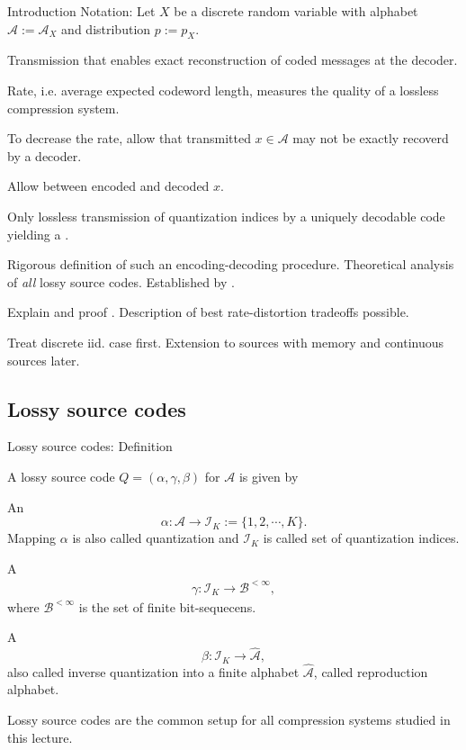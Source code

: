 \begin{frame}{Introduction}
Notation: Let $X$ be a discrete random variable with alphabet $\mathcal{A}:=\mathcal{A}_X$ and distribution $p:=p_X$.

\bit
\item Transmission that enables exact reconstruction of coded messages at the decoder.  
\item Rate, i.e. average expected codeword length, measures the quality of a lossless compression system. 
\eit
{} 
\bit 
\item  To decrease the rate, allow that transmitted $x\in\mathcal{A}$ may not 
be exactly recoverd by a decoder. 
\item Allow  between encoded and decoded $x$. 
\item Only lossless transmission of quantization indices by a uniquely decodable code yielding a . 
\item[\iarrow]  Rigorous definition of such an encoding-decoding procedure. 
\eit
{} Theoretical analysis of \textit{all} lossy source codes. Established by .  
\bit
\item {} Explain and proof . Description 
of best rate-distortion tradeoffs possible.    
\item Treat discrete iid. case first. Extension to sources with memory and continuous sources later. 
\eit
\end{frame}

\subsection{Lossy source codes}
\begin{frame}{Lossy source codes: Definition}
\begin{definition}
A lossy source code $Q=(\alpha,\gamma,\beta)$ for $\mathcal{A}$ is given by
\bit
\item An  
\[
\alpha: \mathcal{A}\to \mathcal{I}_K:=\{1,2,\cdots,K\}. 
\]
Mapping $\alpha$ is also called quantization and $\mathcal{I}_K$ is called set of quantization indices. 
\item A  
\begin{align*}
\gamma: \mathcal{I}_K\to \mathcal{B}^{<\infty}, 
\end{align*}
where $\mathcal{B}^{<\infty}$ is the 
set of finite bit-sequecens. 
\item A 
\[
\beta: \mathcal{I}_K\to\widehat{\mathcal{A}},
\]
also called inverse quantization into a finite alphabet $\widehat{\mathcal{A}}$, called reproduction alphabet.
\eit
\end{definition}
Lossy source codes are the common setup for all compression systems studied in this lecture. 
\end{frame}

